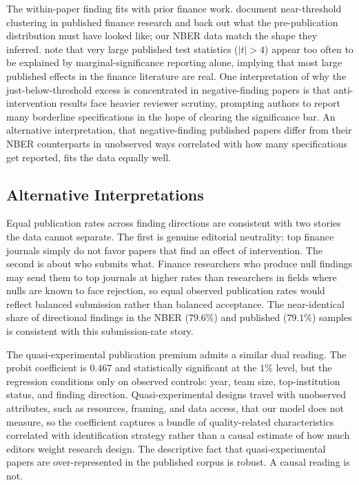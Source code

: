 \documentclass[12pt]{article}
\begin{document}
The within-paper finding fits with prior finance work.
\citet*{Harvey2021} document near-threshold clustering in published
finance research and back out what the pre-publication distribution
must have looked like; our NBER data match the shape they inferred.
\citet*{Chen2021} note that very large published test statistics
($|t|>4$) appear too often to be explained by marginal-significance
reporting alone, implying that most large published effects in the
finance literature are real.  One interpretation of why the
just-below-threshold excess is concentrated in negative-finding
papers is that anti-intervention results face heavier reviewer
scrutiny, prompting authors to report many borderline specifications
in the hope of clearing the significance bar.  An alternative
interpretation, that negative-finding published papers differ from
their NBER counterparts in unobserved ways correlated with how many
specifications get reported, fits the data equally well.

\subsection{Alternative Interpretations}

Equal publication rates across finding directions are consistent
with two stories the data cannot separate.  The first is genuine
editorial neutrality: top finance journals simply do not favor
papers that find an effect of intervention.  The second is about
who submits what.  Finance researchers who produce null findings
may send them to top journals at higher rates than researchers in
fields where nulls are known to face rejection, so equal observed
publication rates would reflect balanced submission rather than
balanced acceptance.  The near-identical share of directional
findings in the NBER ($79.6\%$) and published ($79.1\%$) samples
is consistent with this submission-rate story.

The quasi-experimental publication premium admits a similar dual
reading.  The probit coefficient is $0.467$ and statistically
significant at the $1\%$ level, but the regression conditions only
on observed controls: year, team size, top-institution status, and
finding direction.  Quasi-experimental designs travel with
unobserved attributes, such as resources, framing, and data access,
that our model does not measure, so the coefficient captures a
bundle of
quality-related characteristics correlated with identification
strategy rather than a causal estimate of how much editors weight
research design.  The descriptive fact that quasi-experimental
papers are over-represented in the published corpus is robust.  A
causal reading is not.
\end{document}

